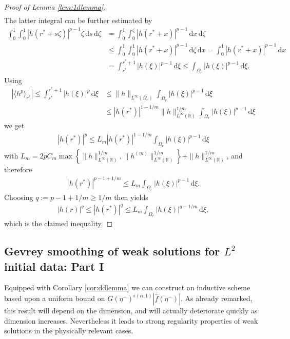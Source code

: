 \documentclass[11pt,a4paper,reqno]{amsart}
\theoremstyle{plain}
\theoremstyle{definition}
\begin{document}
\begin{proof}[Proof of Lemma \ref{lem:1dlemma}]
\begin{align*}
\end{align*}
The latter integral can be further estimated by
\begin{align*}
	\int_0^1 \int_0^1 |h(r^* + s\zeta)|^{p-1} \zeta\,\mathrm{d}s\,\mathrm{d}\zeta &= \int_0^1 \int_0^{\zeta} |h(r^*+x)|^{p-1} \,\mathrm{d}x\,\mathrm{d}\zeta 
	\\
	&\leq \int_0^1 \int_0^1 |h(r^*+x)|^{p-1} \,\mathrm{d}\zeta \,\mathrm{d}x = \int_0^1 |h(r^*+x)|^{p-1} \,\mathrm{d}x \\
	&= \int_{r^*}^{r^*+1} |h(\xi)|^{p-1}\,\mathrm{d}\xi \leq \int_{\Omega_r} |h(\xi)|^{p-1}\,\mathrm{d}\xi.
\end{align*}
Using
\begin{align*}
	\left|\langle h^p\rangle_{r^*}\right| \leq \int_{r^*}^{r^*+1} |h(\xi)|^p\,\mathrm{d}\xi &\leq \|h\|_{L^{\infty}(\Omega_r)} \int_{\Omega_r} |h(\xi)|^{p-1}\,\mathrm{d}\xi \\
	&\leq |h(r^*)|^{1-1/m} \|h\|_{L^{\infty}({\mathbb{R}})}^{1/m} \int_{\Omega_r} |h(\xi)|^{p-1}\,\mathrm{d}\xi
\end{align*}
we get
\begin{align*}
	|h(r^*)|^p \leq L_m |h(r^*)|^{1-1/m} \int_{\Omega_r} |h(\xi)|^{p-1}\,\mathrm{d}\xi
\end{align*}
with $L_m = 2pC_m \max\left\{\|h\|_{L^{\infty}({\mathbb{R}})}^{1/m}, \|h^{(m)}\|_{L^{\infty}({\mathbb{R}})}^{1/m}\right\} +\|h\|_{L^{\infty}({\mathbb{R}})}^{1/m}$,
and therefore
\begin{align*}
	|h(r^*)|^{p-1+1/m} \leq L_m \int_{\Omega_r} |h(\xi)|^{p-1}\,\mathrm{d}\xi.
\end{align*}
Choosing $q:=p-1+1/m \geq 1/m$ then yields
\begin{align*}
	|h(r)|^q \leq |h(r^*)|^q \leq L_m \int_{\Omega_r} |h(\xi)|^{q-1/m}\,\mathrm{d}\xi,
\end{align*}
which is the claimed inequality.
\end{proof}

\subsection{Gevrey smoothing of weak solutions for $L^2$ initial data: Part I}

Equipped with Corollary \ref{cor:ddlemma} we can construct an inductive scheme based upon a uniform bound on $G(\eta^-)^{\epsilon(\alpha, 1)} |\hat{f}(\eta^-)|$. As already remarked, this result will depend on the dimension, and will actually deteriorate quickly as dimension increases. Nevertheless it leads to strong regularity properties of weak solutions in the physically relevant cases.
\end{document}
